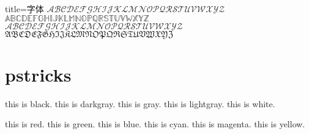 \begin{tcblisting}{title=字体}
  $\mathscr{ABCDEFGHIJKLMNOPQRSTUVWXYZ}$\\
  $\mathbb{ABCDEFGHIJKLMNOPQRSTUVWXYZ}$\\
  $\mathcal{ABCDEFGHIJKLMNOPQRSTUVWXYZ}$\\
  $\mathfrak{ABCDEFGHIJKLMNOPQRSTUVWXYZ}$
\end{tcblisting}

\section{pstricks}
{\black this is black.}
{\darkgray this is darkgray.}
{\gray this is gray.}
{\lightgray this is lightgray.}
{\white this is white.}

{\red this is red.}
{\green this is green.}
{\blue this is blue.}
{\cyan this is cyan.}
{\magenta this is magenta.}
{\yellow this is yellow.}


%	
\newpage

